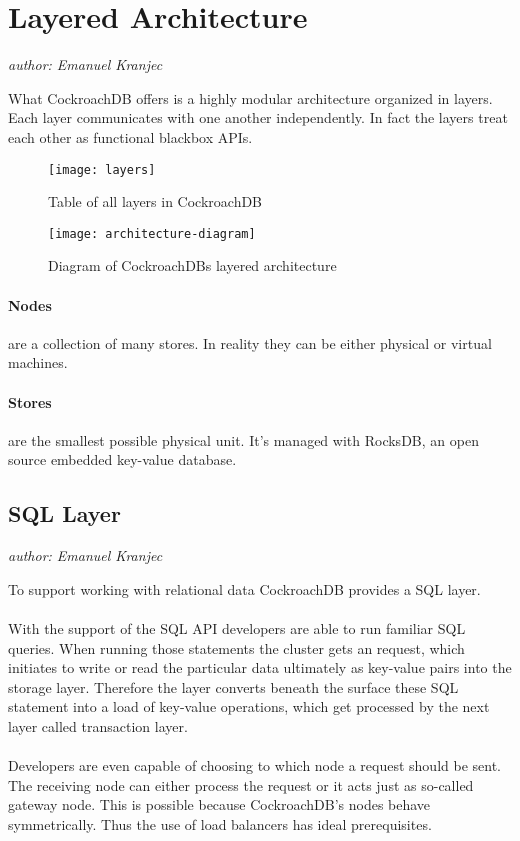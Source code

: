 \section{Layered Architecture}
\emph{author: Emanuel Kranjec}\bigskip

What CockroachDB offers is a highly modular architecture organized in layers. Each layer communicates with one another 
independently. In fact the layers treat each other as functional blackbox APIs.

\begin{figure}[H]
    \texttt{[image: layers]}
    \caption{Table of all layers in CockroachDB\cite{cockroach-architecture-overview}}
    \label{fig:layers}
\end{figure}

\begin{figure}[H]
	\begin{center}
		\texttt{[image: architecture-diagram]}
	\end{center}
    \caption{Diagram of CockroachDBs layered architecture\cite{cockroach-newstack}}
    \label{fig:architecture-diagram}
\end{figure}

\paragraph{Nodes}
are a collection of many stores. In reality they can be either physical or virtual machines.

\paragraph{Stores}
are the smallest possible physical unit. It's managed with RocksDB, an open source embedded key-value database.

\subsection{SQL Layer}
\emph{author: Emanuel Kranjec}\bigskip

To support working with relational data CockroachDB provides a SQL layer.\\ \\
With the support of the SQL API developers are able to run familiar SQL queries. When running those statements the cluster gets an request, which initiates to write or read the particular data ultimately as key-value pairs into the storage layer.
Therefore the layer converts beneath the surface these SQL statement into a load of key-value operations, which get processed by the next layer called transaction layer.\\ \\
Developers are even capable of choosing to which node a request should be sent. The receiving node can either process the request or it acts just as so-called gateway node. This is possible because CockroachDB's nodes behave symmetrically. Thus the use of load balancers has ideal prerequisites.


